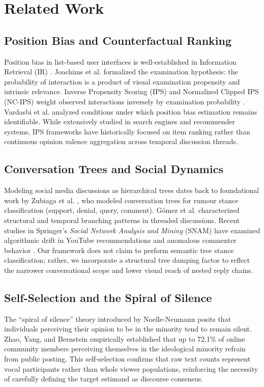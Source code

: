 \documentclass[journal]{IEEEtran}
\begin{document}
\section{Related Work}

\subsection{Position Bias and Counterfactual Ranking}
Position bias in list-based user interfaces is well-established in Information Retrieval (IR) \cite{craswell2008experimental}. Joachims et al. \cite{joachims2017unbiased} formalized the examination hypothesis: the probability of interaction is a product of visual examination propensity and intrinsic relevance. Inverse Propensity Scoring (IPS) and Normalized Clipped IPS (NC-IPS) weight observed interactions inversely by examination probability \cite{wang2018position, agarwal2019addressing}. Vardasbi et al. \cite{vardasbi2020when} analyzed conditions under which position bias estimation remains identifiable. While extensively studied in search engines and recommender systems, IPS frameworks have historically focused on item ranking rather than continuous opinion valence aggregation across temporal discussion threads.

\subsection{Conversation Trees and Social Dynamics}
Modeling social media discussions as hierarchical trees dates back to foundational work by Zubiaga et al. \cite{zubiaga2016stance}, who modeled conversation trees for rumour stance classification (support, denial, query, comment). G{\'o}mez et al. \cite{gomez2008statistical} characterized structural and temporal branching patterns in threaded discussions. Recent studies in Springer's \textit{Social Network Analysis and Mining} (SNAM) have examined algorithmic drift in YouTube recommendations \cite{cakmak2024bias} and anomalous commenter behavior \cite{shajari2025safeguarding}. Our framework does not claim to perform semantic tree stance classification; rather, we incorporate a structural tree damping factor to reflect the narrower conversational scope and lower visual reach of nested reply chains.

\subsection{Self-Selection and the Spiral of Silence}
The ``spiral of silence'' theory introduced by Noelle-Neumann \cite{noelle1974spiral} posits that individuals perceiving their opinion to be in the minority tend to remain silent. Zhao, Yang, and Bernstein \cite{zhao2025spiral} empirically established that up to 72.1\% of online community members perceiving themselves in the ideological minority refrain from public posting. This self-selection confirms that raw text counts represent vocal participants rather than whole viewer populations, reinforcing the necessity of carefully defining the target estimand as discourse consensus.
\end{document}
